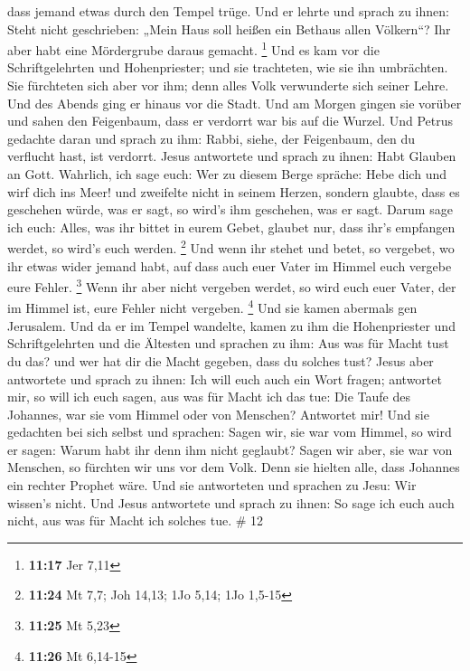 dass jemand etwas durch den Tempel trüge.  Und er lehrte
und sprach zu ihnen: Steht nicht geschrieben: „Mein Haus soll heißen ein
Bethaus allen Völkern``? Ihr aber habt eine Mördergrube daraus gemacht.
\footnote{\textbf{11:17} Jer 7,11}  Und es kam vor die
Schriftgelehrten und Hohenpriester; und sie trachteten, wie sie ihn
umbrächten. Sie fürchteten sich aber vor ihm; denn alles Volk
verwunderte sich seiner Lehre.  Und des Abends ging er
hinaus vor die Stadt.  Und am Morgen gingen sie vorüber
und sahen den Feigenbaum, dass er verdorrt war bis auf die Wurzel.
 Und Petrus gedachte daran und sprach zu ihm: Rabbi,
siehe, der Feigenbaum, den du verflucht hast, ist verdorrt.
 Jesus antwortete und sprach zu ihnen: Habt Glauben an
Gott.  Wahrlich, ich sage euch: Wer zu diesem Berge
spräche: Hebe dich und wirf dich ins Meer! und zweifelte nicht in seinem
Herzen, sondern glaubte, dass es geschehen würde, was er sagt, so wird's
ihm geschehen, was er sagt.  Darum sage ich euch: Alles,
was ihr bittet in eurem Gebet, glaubet nur, dass ihr's empfangen werdet,
so wird's euch werden. \footnote{\textbf{11:24} Mt 7,7; Joh 14,13; 1Jo
  5,14; 1Jo 1,5-15}  Und wenn ihr stehet und betet, so
vergebet, wo ihr etwas wider jemand habt, auf dass auch euer Vater im
Himmel euch vergebe eure Fehler. \footnote{\textbf{11:25} Mt 5,23}
 Wenn ihr aber nicht vergeben werdet, so wird euch euer
Vater, der im Himmel ist, eure Fehler nicht vergeben. \footnote{\textbf{11:26}
  Mt 6,14-15}  Und sie kamen abermals gen Jerusalem. Und
da er im Tempel wandelte, kamen zu ihm die Hohenpriester und
Schriftgelehrten und die Ältesten  und sprachen zu ihm:
Aus was für Macht tust du das? und wer hat dir die Macht gegeben, dass
du solches tust?  Jesus aber antwortete und sprach zu
ihnen: Ich will euch auch ein Wort fragen; antwortet mir, so will ich
euch sagen, aus was für Macht ich das tue:  Die Taufe des
Johannes, war sie vom Himmel oder von Menschen? Antwortet mir!
 Und sie gedachten bei sich selbst und sprachen: Sagen
wir, sie war vom Himmel, so wird er sagen: Warum habt ihr denn ihm nicht
geglaubt?  Sagen wir aber, sie war von Menschen, so
fürchten wir uns vor dem Volk. Denn sie hielten alle, dass Johannes ein
rechter Prophet wäre.  Und sie antworteten und sprachen
zu Jesu: Wir wissen's nicht. Und Jesus antwortete und sprach zu ihnen:
So sage ich euch auch nicht, aus was für Macht ich solches tue. \# 12

